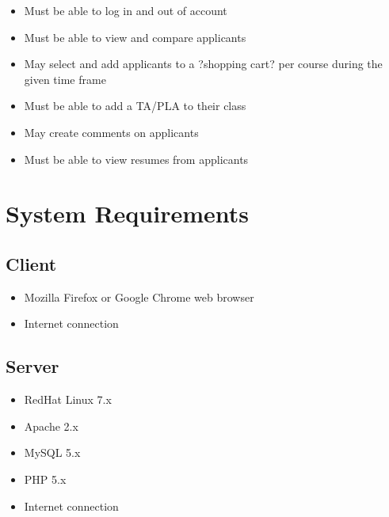 \documentclass[11pt]{amsart}
\begin{document}
\begin{itemize}

\item{Must be able to log in and out of account}


\item{Must be able to view and compare applicants}


\item{May select and add applicants to a ?shopping cart? per course during the given time frame}


\item{Must be able to add a TA/PLA to their class}


\item{May create comments on applicants}


\item{Must be able to view resumes from applicants}


\end{itemize}

\section{System Requirements}
\subsection{Client}
\begin{itemize}
\item{Mozilla Firefox or Google Chrome web browser}
\item{Internet connection}
\end{itemize}

\subsection{Server}
\begin{itemize}
\item{RedHat Linux 7.x}
\item{Apache 2.x}
\item{MySQL 5.x}
\item{PHP 5.x}
\item{Internet connection}
\end{itemize}
\end{document}
